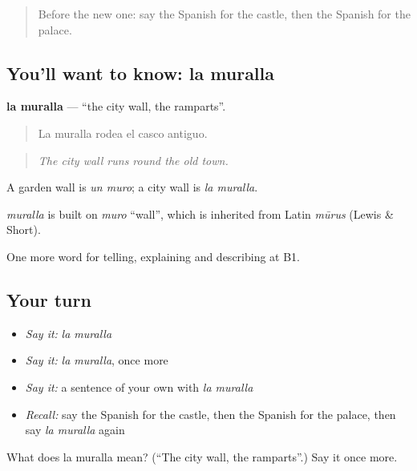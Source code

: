 \label{lesson:ES-C677-muralla}



\begin{quote}
Before the new one: say the Spanish for the castle, then the Spanish for the palace.
\end{quote}

\subsection*{You'll want to know: la muralla}
\textbf{la muralla} — \textquotedblleft{}the city wall, the ramparts\textquotedblright{}.

\begin{quote}
La muralla rodea el casco antiguo.
\end{quote}

\begin{quote}
\emph{The city wall runs round the old town.}
\end{quote}

A garden wall is \emph{un muro}; a city wall is \emph{la muralla}.

\begin{cousinweb}
\emph{muralla} is built on \emph{muro} \textquotedblleft{}wall\textquotedblright{}, which is inherited from Latin \emph{mūrus} (Lewis \& Short).
\end{cousinweb}

\begin{grammarlens}[title={What you've built}]
One more word for telling, explaining and describing at B1.
\end{grammarlens}

\subsection*{Your turn}
\begin{itemize}
\raggedright
  \item \emph{Say it:} \emph{la muralla}
  \item \emph{Say it:} \emph{la muralla}, once more
  \item \emph{Say it:} a sentence of your own with \emph{la muralla}
  \item \emph{Recall:} say the Spanish for the castle, then the Spanish for the palace, then say \emph{la muralla} again
\end{itemize}

\begin{tcolorbox}[breakable,colback=teal!4,colframe=teal!35!black,title={Before you move on}]
What does la muralla mean? (\textquotedblleft{}The city wall, the ramparts\textquotedblright{}.) Say it once more.
\end{tcolorbox}
